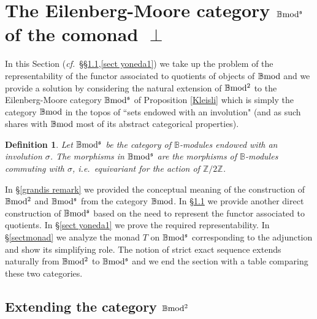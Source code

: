 \documentclass[12pt]{article}
\newtheorem{defn}[thm]{Definition}
\def\B{{\mathbb B}}
\def\Z{{\mathbb Z}}
\def\strg{strict }
\newcommand{\ie}{{\it i.e.\/}\ }
\newcommand{\cf}{{\it cf.}}
\def\bmod{{\rm \B mod}}
\def\bm2{{\rm \B mod^2}}
\def\b2{{\rm \B mod^{\mathfrak s}}}
\begin{document}
\section{The  Eilenberg-Moore category $\b2$ of the comonad $\perp$}\label{secthomologbmods}


In this Section (\cf~\S\S\ref{sect yoneda},\ref{sect yoneda1}) we take up the problem of the representability of the functor associated to quotients of objects of $\bmod$ and we provide a solution by considering the natural extension of $\bm2$ to the Eilenberg-Moore category $\b2$ of Proposition \ref{Kleisli} which is simply the category $\bmod$ in the topos of ``sets endowed with an involution" (and as such shares with $\bmod$ most of its abstract categorical properties).
\begin{defn}\label{catb2} Let $\b2$ be the category of $\B$-modules endowed with an involution $\sigma$. The morphisms in $\b2$ are the morphisms of $\B$-modules commuting with $\sigma$, \ie equivariant for the action of $\Z/2\Z$. 
\end{defn} 	
 In \S\ref{grandis remark} we provided the conceptual meaning of the construction of  $\bm2$ and $\b2$ from the category $\bmod$.  In \S \ref{sect yoneda} we provide another direct construction of $\b2$ based on the need to represent the functor associated to quotients. In \S \ref{sect yoneda1} we prove the required representability.  In \S \ref{sectmonad} we analyze the  monad $T$ on $\b2$ corresponding to the adjunction  and show its simplifying role. The notion of \strg exact sequence extends naturally from $\bm2$ to $\b2$ and we end the section with a table comparing these two categories.
   
 \subsection{Extending the category $\bm2$}\label{sect yoneda}
 
  
 
\end{document}
